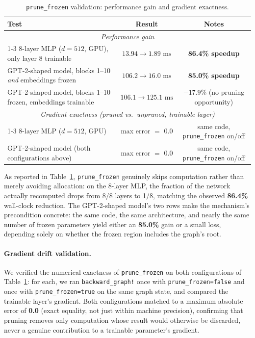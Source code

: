 \documentclass{article}
\begin{document}
\begin{table}[H]
\centering
\caption{\texttt{prune\_frozen} validation: performance gain and gradient exactness.}
\label{tab:incr_backward}
\begin{tabularx}{\textwidth}{X c c}
\toprule
\textbf{Test} & \textbf{Result} & \textbf{Notes} \\
\midrule
\multicolumn{3}{c}{\textit{Performance gain}} \\
\cmidrule{1-3}
8-layer MLP ($d=512$, GPU), only layer 8 trainable & $13.94 \to 1.89\text{ ms}$ & \textbf{86.4\% speedup} \\
\rowcolor{rowgray}
\raggedright GPT-2-shaped model, blocks 1--10 \emph{and} embeddings frozen & $106.2 \to 16.0\text{ ms}$ & \textbf{85.0\% speedup} \\
GPT-2-shaped model, blocks 1--10 frozen, embeddings trainable & $106.1 \to 125.1\text{ ms}$ & $-$17.9\% (no pruning opportunity) \\
\midrule
\multicolumn{3}{c}{\textit{Gradient exactness (pruned vs.\ unpruned, trainable layer)}} \\
\cmidrule{1-3}
8-layer MLP ($d=512$, GPU) & max error $=$ 0.0 & same code, \texttt{prune\_frozen} on/off \\
GPT-2-shaped model (both configurations above) & max error $=$ 0.0 & same code, \texttt{prune\_frozen} on/off \\
\bottomrule
\end{tabularx}
\end{table}
As reported in Table~\ref{tab:incr_backward}, \texttt{prune\_frozen} genuinely skips computation rather than merely avoiding allocation: on the 8-layer MLP, the fraction of the network actually recomputed drops from 8/8 layers to 1/8, matching the observed \textbf{86.4\%} wall-clock reduction. The GPT-2-shaped model's two rows make the mechanism's precondition concrete: the same code, the same architecture, and nearly the same number of frozen parameters yield either an \textbf{85.0\%} gain or a small loss, depending solely on whether the frozen region includes the graph's root.

\paragraph{Gradient drift validation.}
We verified the numerical exactness of \texttt{prune\_frozen} on both configurations of Table~\ref{tab:incr_backward}: for each, we ran \texttt{backward\_graph!} once with \texttt{prune\_frozen=false} and once with \texttt{prune\_frozen=true} on the same graph state, and compared the trainable layer's gradient. Both configurations matched to a maximum absolute error of \textbf{0.0} (exact equality, not just within machine precision), confirming that pruning removes only computation whose result would otherwise be discarded, never a genuine contribution to a trainable parameter's gradient.
\end{document}
